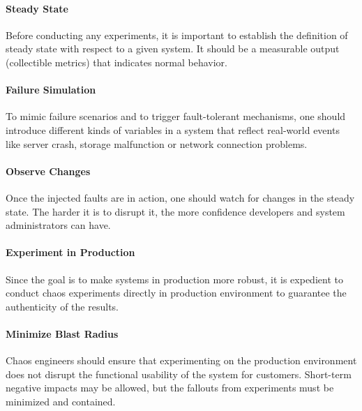 \paragraph{Steady State} Before conducting any experiments, it is important to establish the definition of steady state with respect to a given system. It should be a measurable output (\eg collectible metrics) that indicates normal behavior.

\paragraph{Failure Simulation} To mimic failure scenarios and to trigger fault-tolerant mechanisms, one should introduce different kinds of variables in a system that reflect real-world events like server crash, storage malfunction or network connection problems.

\paragraph{Observe Changes} Once the injected faults are in action, one should watch for changes in the steady state. The harder it is to disrupt it, the more confidence developers and system administrators can have.

\paragraph{Experiment in Production} Since the goal is to make systems in production more robust, it is expedient to conduct chaos experiments directly in production environment to guarantee the authenticity of the results.

\paragraph{Minimize Blast Radius} Chaos engineers should ensure that experimenting on the production environment does not disrupt the functional usability of the system for customers. Short-term negative impacts may be allowed, but the fallouts from experiments must be minimized and contained.

